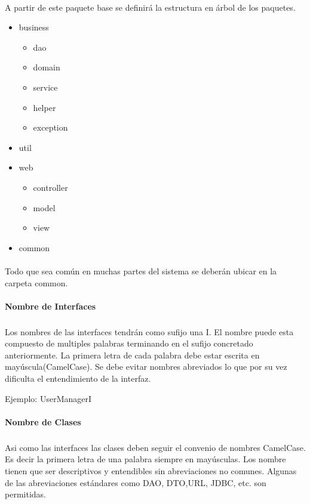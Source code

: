 \paragraph{}
A partir de este paquete base se definirá la estructura en árbol de los paquetes.

\begin{itemize}
\item
  business
  \begin{itemize}
  \item
    dao
  \item
    domain
  \item
    service
  \item
    helper
  \item
    exception
  \end{itemize}
\item
  util
\item
  web
  \begin{itemize}
  \item
    controller
  \item
    model
  \item
    view
  \end{itemize}
\item
  common
\end{itemize}

\paragraph{}
Todo que sea común en muchas partes del sistema se deberán ubicar en la carpeta common.

\paragraph{Nombre de Interfaces}
\subparagraph{}
Los nombres de las interfaces tendrán como sufijo una I. El nombre puede esta compuesto de multiples palabras terminando en el sufijo concretado anteriormente. La primera letra de cada palabra debe estar escrita en mayúscula(CamelCase). Se debe evitar nombres abreviados lo que por su vez dificulta el entendimiento de la interfaz.

Ejemplo: UserManagerI

\paragraph{Nombre de Clases}
\subparagraph{}
Asi como las interfaces las clases deben seguir el convenio de nombres CamelCase. Es decir la primera letra de una palabra siempre en mayúsculas. Los nombre tienen que ser descriptivos y entendibles sin abreviaciones no comunes. Algunas de las abreviaciones estándares como DAO, DTO,URL, JDBC, etc. son permitidas.

